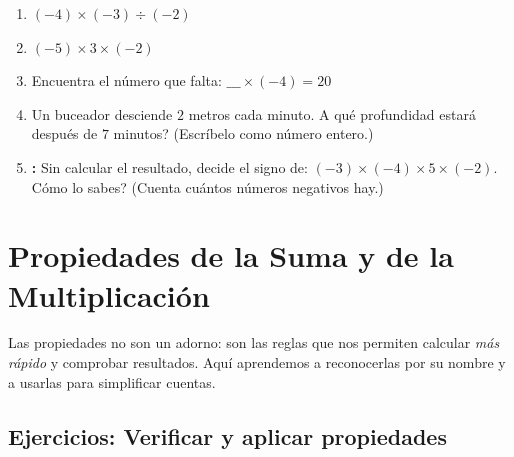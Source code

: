 \documentclass[12pt, letterpaper]{article}
\begin{document}
\begin{enumerate}[leftmargin=*, start=55]
  \item \dificil{} $(-4) \times (-3) \div (-2)$

  \item \dificil{} $(-5) \times 3 \times (-2)$

  \item \dificil{} Encuentra el número que falta: $\_\_\_ \times (-4) = 20$

  \item \dificil{} Un buceador desciende $2$ metros cada minuto. \textquestiondown A qué profundidad estará después de $7$ minutos? (Escríbelo como número entero.)

  \item \dificil{} \textbf{:} Sin calcular el resultado, decide el signo de: $(-3) \times (-4) \times 5 \times (-2)$. \textquestiondown Cómo lo sabes? (Cuenta cuántos números negativos hay.)
\end{enumerate}

\newpage

\section{Propiedades de la Suma y de la Multiplicación}

\noindent Las propiedades no son un adorno: son las reglas que nos permiten calcular \emph{más rápido} y comprobar resultados. Aquí aprendemos a reconocerlas por su nombre y a usarlas para simplificar cuentas.

\subsection{Ejercicios: Verificar y aplicar propiedades}
\end{document}
